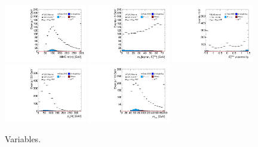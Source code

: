 \begin{figure}[tp]
  \includegraphics[width=0.32\textwidth]{figures/antitaus/mMMC}
  \includegraphics[width=0.32\textwidth]{figures/antitaus/mT}
  \includegraphics[width=0.32\textwidth]{figures/antitaus/met-phi-centrality}
  \includegraphics[width=0.32\textwidth]{figures/antitaus/H-pt-hi}
  \includegraphics[width=0.32\textwidth]{figures/antitaus/mvis}
  \caption{Variables.}
  \label{fig:backgrounds-antitaus-taus}
\end{figure}

\clearpage

